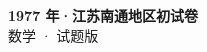 \documentclass[zihao=-4, a4paper]{ctexart}
\begin{document}
\begin{center}
  {\Large\bfseries 1977 年·江苏南通地区初试卷}\\[4pt]
  {\large 数学 · 试题版}
\end{center}
\medskip
{}

\end{document}
